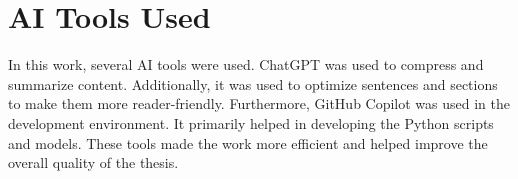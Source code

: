 \section{AI Tools Used}
\label{sec:AIToolsUsed}
In this work, several AI tools were used. ChatGPT was used to compress and summarize content. Additionally, it was used to optimize sentences and sections to make them more reader-friendly. Furthermore, GitHub Copilot was used in the development environment. It primarily helped in developing the Python scripts and models. These tools made the work more efficient and helped improve the overall quality of the thesis.


